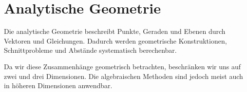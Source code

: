 \chapter{Analytische Geometrie}
\label{chap:analytic_geometry}

Die analytische Geometrie beschreibt Punkte, Geraden und Ebenen durch
Vektoren und Gleichungen. Dadurch werden geometrische Konstruktionen,
Schnittprobleme und Abstände systematisch berechenbar.

Da wir diese Zusammenhänge geometrisch betrachten, beschränken wir uns auf
zwei und drei Dimensionen. Die algebraischen Methoden sind jedoch meist auch
in höheren Dimensionen anwendbar.


\clearpage

\clearpage

\clearpage

\clearpage

\clearpage

